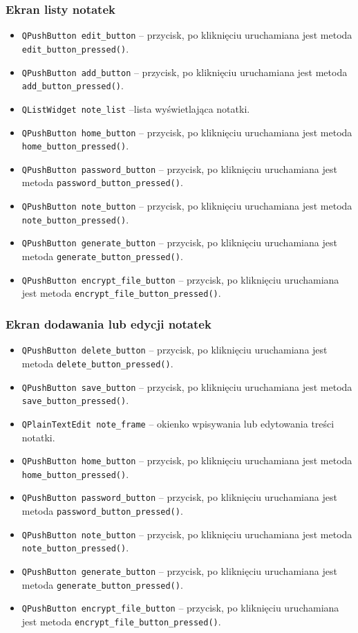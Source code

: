 \documentclass[a4paper]{article}
\newcommand{\prog}{\texttt}
\begin{document}
\subsubsection{Ekran listy notatek}
\begin{itemize}
    \item \prog{QPushButton edit\_button} -- przycisk, po kliknięciu uruchamiana jest metoda \prog{edit\_button\_pressed()}.
    \item \prog{QPushButton add\_button} -- przycisk, po kliknięciu uruchamiana jest metoda \prog{add\_button\_pressed()}.
    \item \prog{QListWidget note\_list} --lista wyświetlająca notatki.
    \item \prog{QPushButton home\_button} -- przycisk, po kliknięciu uruchamiana jest metoda \prog{home\_button\_pressed()}.
    \item \prog{QPushButton password\_button} -- przycisk, po kliknięciu uruchamiana jest metoda \prog{password\_button\_pressed()}.
    \item \prog{QPushButton note\_button} -- przycisk, po kliknięciu uruchamiana jest metoda \prog{note\_button\_pressed()}.
    \item \prog{QPushButton generate\_button} -- przycisk, po kliknięciu uruchamiana jest metoda \prog{generate\_button\_pressed()}.
    \item \prog{QPushButton encrypt\_file\_button} -- przycisk, po kliknięciu uruchamiana jest metoda \prog{encrypt\_file\_button\_pressed()}.
\end{itemize}

\subsubsection{Ekran dodawania lub edycji notatek}
\begin{itemize}
    \item \prog{QPushButton delete\_button} -- przycisk, po kliknięciu uruchamiana jest metoda \prog{delete\_button\_pressed()}.
    \item \prog{QPushButton save\_button} -- przycisk, po kliknięciu uruchamiana jest metoda \prog{save\_button\_pressed()}.
    \item \prog{QPlainTextEdit note\_frame} -- okienko wpisywania lub edytowania treści notatki.
    \item \prog{QPushButton home\_button} -- przycisk, po kliknięciu uruchamiana jest metoda \prog{home\_button\_pressed()}.
    \item \prog{QPushButton password\_button} -- przycisk, po kliknięciu uruchamiana jest metoda \prog{password\_button\_pressed()}.
    \item \prog{QPushButton note\_button} -- przycisk, po kliknięciu uruchamiana jest metoda \prog{note\_button\_pressed()}.
    \item \prog{QPushButton generate\_button} -- przycisk, po kliknięciu uruchamiana jest metoda \prog{generate\_button\_pressed()}.
    \item \prog{QPushButton encrypt\_file\_button} -- przycisk, po kliknięciu uruchamiana jest metoda \prog{encrypt\_file\_button\_pressed()}.
\end{itemize}
\end{document}
